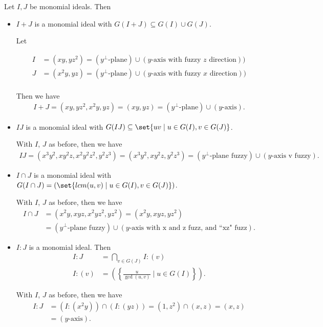 Let $I, J $ be monomial ideals. Then
\begin{itemize}
    \item $I + J$ is a monomial ideal with $G(I + J) \subseteq G(I) \cup G(J)$.
    \begin{example}
        Let 
        
        \begin{align*}
            I &= (xy, yz^2) = (y^\bot \text{-plane}) \cup (y \text{-axis with fuzzy } z \text{ direction}))\\
            J &= (x^2y, yz) = (y^\bot \text{-plane}) \cup (y \text{-axis with fuzzy } x \text{ direction}))\\
        \end{align*}
        
        Then we have
        \begin{align*}
            I + J = ( xy , yz^2 , x^2 y , yz) = (xy, yz) = (y^\bot \text{-plane}) \cup (y \text{-axis}).
        \end{align*}
    \end{example}
    \item $IJ$ is a monomial ideal with $G(I J) \subseteq \set{uv \mid u \in G(I) , v \in G(J)}$.
    \begin{example}
        With $I$, $J$ as before, then we have
        \begin{align*}
            I J = ( x^3y^2, xy^2z , x^2y^2z^2, y^2 z^3) = ( x^3y^2, xy^2z, y^2 z^3) = (y^\bot \text{-plane fuzzy}) \cup (y \text{-axis v fuzzy}).
        \end{align*}
    \end{example}
    \item $I \cap J$ is a monomial ideal with $G(I \cap J) = ( \set{ lcm(u,v) \mid u \in G(I) , v \in G(J)} )$.
    \begin{example}
        With $I$, $J$ as before, then we have
        \begin{align*}
            I \cap J &= ( x^2y, xyz , x^2yz^2, y z^2) = ( x^2y, xyz , y z^2)\\ &= (y^\bot \text{-plane fuzzy}) \cup (y \text{-axis with x and z fuzz, and ``xz" fuzz}).
        \end{align*}
    \end{example}
    \item $I : J$ is a monomial ideal. Then
    \begin{align*}
        I : J &=  \bigcap_{v \in G(J) } I : (v)\\
        I : (v) &= \left ( \left \{ \frac{u}{\gcd(u,v) } \mid u \in G(I)  \right \} \right ).
    \end{align*}
    \begin{example}
        With $I$, $J$ as before, then we have
        \begin{align*}
            I : J &= (I : (x^2 y) ) \cap ( I : (yz)) = (1,z^2 ) \cap (x,z) = (x,z)\\ &=  (y \text{-axis}).
        \end{align*}
    \end{example}
\end{itemize}


